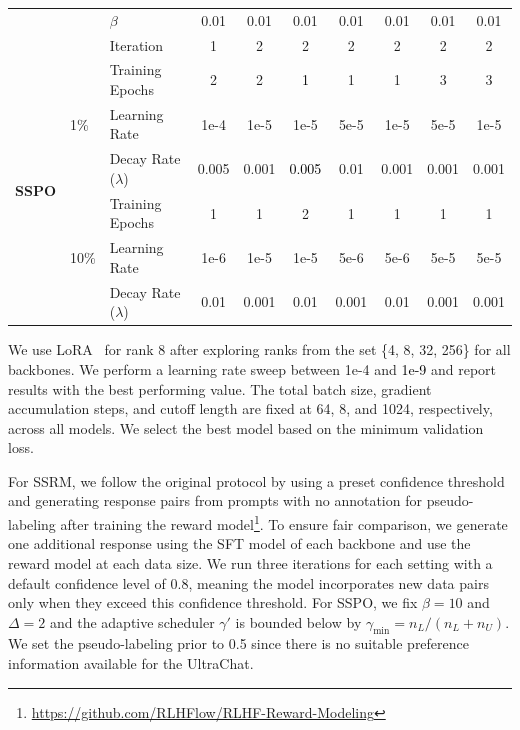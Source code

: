 \documentclass{article} %
\newcommand\rebuttal[1]{\textcolor{black}{#1}}
\begin{document}
\begin{table}[hp]
\begin{tabular}{lll ccc cc cc}
& & $\beta$ & 0.01 & 0.01 & 0.01 & 0.01 & 0.01 & 0.01 & 0.01 \\
& & Iteration & 1 & 2 & 2 & 2 & 2 & 2 & 2 \\
\midrule
\midrule
\multirow{6}{*}{\textbf{SSPO}} 
& \multirow{3}{*}{1\%}
& Training Epochs & 2 & 2 & \rebuttal{1} & 1 & 1 & 3 & 3 \\
& & Learning Rate & 1e-4 & 1e-5 & 1e-5 & 5e-5 & 1e-5 & 5e-5 & 1e-5 \\
& & Decay Rate ($\lambda$) & 0.005 & 0.001 & \rebuttal{0.005} & 0.01 & 0.001 & 0.001 & 0.001 \\
\cmidrule{2-10}
& \multirow{3}{*}{10\%}
& Training Epochs & 1 & 1 & 2 & 1 & 1 & 1 & 1 \\
& & Learning Rate & 1e-6 & 1e-5 & 1e-5 & 5e-6 & 5e-6 & 5e-5 & 5e-5 \\
& & Decay Rate ($\lambda$) & 0.01 & 0.001 & 0.01 & 0.001 & 0.01 & 0.001 & 0.001 \\
\bottomrule
\end{tabular}
\end{table}

We use LoRA~\citep{hu2021loralowrankadaptationlarge} for rank 8 after exploring ranks from the set \{4, 8, 32, 256\} for all backbones. We perform a learning rate sweep between 1e-4 and \rebuttal{1e-9} and report results with the best performing value. The total batch size, gradient accumulation steps, and cutoff length are fixed at 64, 8, and 1024, respectively, across all models. We select the best model based on the minimum validation loss.

For SSRM, we follow the original protocol by using a preset confidence threshold and generating response pairs from prompts with no annotation for pseudo-labeling after training the reward model\footnote{\url{https://github.com/RLHFlow/RLHF-Reward-Modeling}}. To ensure fair comparison, we generate one additional response using the SFT model of each backbone and use the reward model at each data size. We run three iterations for each setting with a default confidence level of 0.8, meaning the model incorporates new data pairs only when they exceed this confidence threshold.
For SSPO, we fix $\beta=10$ and $\Delta=2$ and the adaptive scheduler $\gamma'$ is bounded below by $\gamma_{\min} = n_L / (n_L + n_U)$. We set the pseudo-labeling prior to 0.5 since there is no suitable preference information available for the UltraChat.



\end{document}
